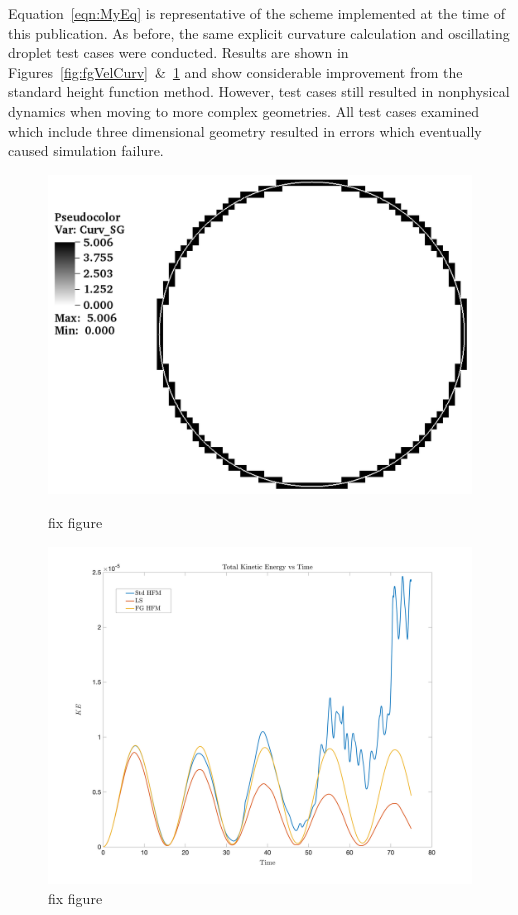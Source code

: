 Equation~\ref{eqn:MyEq} is representative of the scheme implemented at the time of this publication. As before, the same explicit curvature calculation and oscillating droplet test cases were conducted. Results are shown in Figures~\ref{fig:fgVelCurv}~\&~\ref{fig:fgVelKE} and show considerable improvement from the standard height function method. However, test cases still resulted in nonphysical dynamics when moving to more complex geometries. All test cases examined which include three dimensional geometry resulted in errors which eventually caused simulation failure. 
\begin{figure}[htbp]
	\centering
	\begin{minipage}{.5\textwidth}
		\centering
		\includegraphics[width=1.0\linewidth]{figs/curvCalc.png}
		\caption{fix figure}
		\label{fig:fgVelCurv}
	\end{minipage}%
	\begin{minipage}{0.5\textwidth}
		\centering
		\includegraphics[width=1.0\linewidth]{figs/KEvT}
		\caption{fix figure}
		\label{fig:fgVelKE}
	\end{minipage}
\end{figure}
